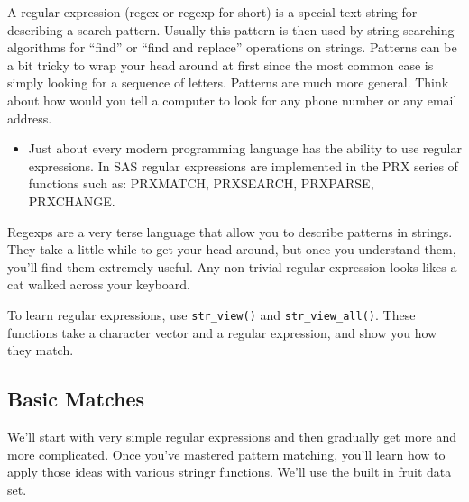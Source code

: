 \documentclass[]{book}
\newenvironment{rmdblock}[1]
  {\begin{shaded*}
  \begin{itemize}
  \renewcommand{\labelitemi}{
    \raisebox{-.7\height}[0pt][0pt]{
      {\setkeys{Gin}{width=3em,keepaspectratio}\texttt{[image: images/\#1]}}
    }
  }
  \item
  }
  {
  \end{itemize}
  \end{shaded*}
  }
\newenvironment{rmdnote}
  {\begin{rmdblock}{note}}
  {\end{rmdblock}}
\theoremstyle{definition}
\theoremstyle{definition}
\theoremstyle{definition}
\theoremstyle{remark}
\let\BeginKnitrBlock\begin \let\EndKnitrBlock\end
\begin{document}
A regular expression (regex or regexp for short) is a special text
string for describing a search pattern. Usually this pattern is then
used by string searching algorithms for ``find'' or ``find and replace''
operations on strings. Patterns can be a bit tricky to wrap your head
around at first since the most common case is simply looking for a
sequence of letters. Patterns are much more general. Think about how
would you tell a computer to look for any phone number or any email
address.

\begin{rmdnote}
Just about every modern programming language has the ability to use
regular expressions. In SAS regular expressions are implemented in the
PRX series of functions such as: PRXMATCH, PRXSEARCH, PRXPARSE,
PRXCHANGE.
\end{rmdnote}

Regexps are a very terse language that allow you to describe patterns in
strings. They take a little while to get your head around, but once you
understand them, you'll find them extremely useful. Any non-trivial
regular expression looks likes a cat walked across your keyboard.

\BeginKnitrBlock{rmdtip}
To learn regular expressions, use \texttt{str\_view()} and
\texttt{str\_view\_all()}. These functions take a character vector and a
regular expression, and show you how they match.
\EndKnitrBlock{rmdtip}

\hypertarget{basic-matches}{%
\subsection{Basic Matches}\label{basic-matches}}

We'll start with very simple regular expressions and then gradually get
more and more complicated. Once you've mastered pattern matching, you'll
learn how to apply those ideas with various stringr functions. We'll use
the built in fruit data set.
\end{document}
